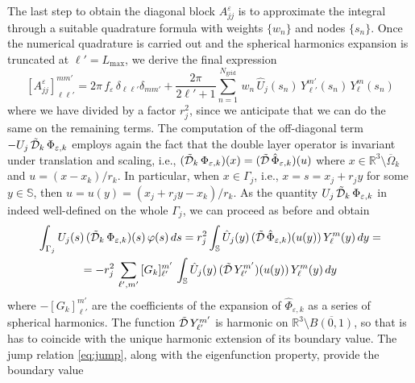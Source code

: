 The last step to obtain the diagonal block $A_{jj}^\varepsilon$ is to approximate the integral through a suitable quadrature formula with weights $\{w_n\}$ and nodes $\{ s_n\}$. Once the numerical quadrature is carried out and the spherical harmonics expansion is truncated at $\ell' = L_\text{max}$, we derive the final expression
\begin{equation}\label{eq:ajj}
[A_{jj}^\varepsilon]_{\ell \ell'}^{mm'} = 2\pi \, f_\varepsilon %
 \,  \delta_{\ell \ell'} \delta_{mm'} + \frac{2\pi}{2\ell'+1} \sum_{n=1}^{N_\text{grid}} \, w_n \, \hat{U}_j(s_n)  \, Y_{\ell'}^{m'}(s_n)\,  Y_\ell^m(s_n)
\end{equation}
where we have divided by a factor $r_j^2$, since we anticipate that we can do the same on the remaining terms. The computation of the off-diagonal term $-U_j \, \tilde{\mathcal{D}}_k \, \Phi_{\varepsilon,k}$ employs again the fact that the double layer operator is invariant under translation and scaling, i.e., $(\tilde{\mathcal{D}}_k \, \Phi_{\varepsilon,k} )(x) = (\tilde{\mathcal{D}} \, \hat{\Phi}_{\varepsilon,k})(u)$ where $x \in \mathbb{R}^3 \setminus \overline{\Omega}_k$ and $u = (x -x_k)/ r_k$. In particular, when $x \in \Gamma_j$, i.e., $x = s = x_j + r_j y$ for some $y \in \mathbb{S}$, then $u = u(y) = (x_j + r_j y -x_k)/r_k$. As the quantity $U_j \, \tilde{\mathcal{D}}_k \, \Phi_{\varepsilon,k}$ in indeed well-defined on the whole $\Gamma_j$, we can proceed as before and obtain
\begin{multline*}
\int_{\Gamma_j}U_j(s) \, (\tilde{\cD}_k \, \Phi_{\varepsilon,k})(s) \, \varphi(s) \, ds
 = r_j^2  \int_{\mathbb{S}} \hat{U}_j(y) \, (\tilde{\cD} \, \hat{\Phi}_{\varepsilon,k})(u(y)) \, Y_{\ell}^{m}(y) \, dy = \\ %
= - r_j^2 \, \sum_{\ell',m'} \, [G_k]_{\ell'}^{m'} \,  \int_{\mathbb{S}} \hat{U}_j(y) \, (\tilde{\cD} \, Y_{\ell'}^{m'})(u(y)) \, Y_{\ell}^{m}(y) \, dy 
\end{multline*}
where $-[G_k]_{\ell'}^{m'}$ are the coefficients of the expansion of $ \hat{\Phi}_{\varepsilon,k}$ as a series of spherical harmonics. The function $\tilde{\mathcal{D}} \, Y_{\ell'}^{m'}$ is harmonic on $\mathbb{R}^3 \setminus \overline{B(0,1)}$, so that is has to coincide with the unique harmonic extension of its boundary value. The jump relation \eqref{eq:jump}, along with the eigenfunction property, provide the boundary value
